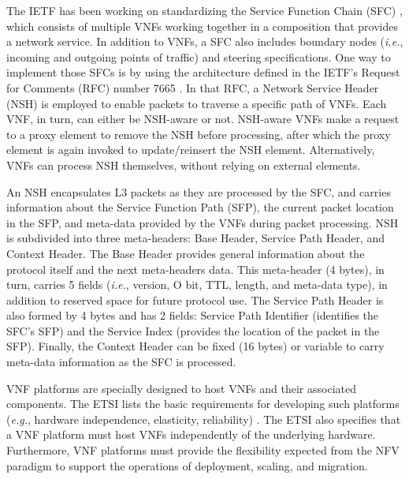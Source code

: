 The IETF has been working on standardizing the Service Function Chain (SFC) \cite{Joel-2015}, which consists of multiple VNFs working together in a composition that provides a network service. In addition to VNFs, a SFC also includes boundary nodes (\textit{i.e.},  incoming and outgoing points of traffic) and steering specifications. One way to implement those SFCs is by using the architecture defined in the IETF's Request for Comments (RFC) number 7665 \cite{Joel-2015}. In that RFC, a Network Service Header (NSH) \cite{Quinn-2018} is employed to enable packets to traverse a specific path of VNFs. Each VNF, in turn, can either be NSH-aware or not. NSH-aware VNFs make a request to a proxy element to remove the NSH before processing, after which the proxy element is again invoked to update/reinsert the NSH element. Alternatively, VNFs can process NSH themselves, without relying on external elements.

An NSH encapsulates L3 packets as they are processed by the SFC, and carries information about the Service Function Path (SFP), the current packet location in the SFP, and meta-data provided by the VNFs during packet processing.  NSH is subdivided into three meta-headers: Base Header, Service Path Header, and Context Header. The Base Header provides general information about the protocol itself and the next meta-headers data. This meta-header (4 bytes), in turn, carries 5 fields (\textit{i.e.}, version, O bit, TTL, length, and meta-data type), in addition to reserved space for future protocol use. The Service Path Header is also formed by 4 bytes and has 2 fields: Service Path Identifier (identifies the SFC's SFP) and the Service Index (provides the location of the packet in the SFP). Finally, the Context Header can be fixed (16 bytes) or variable to carry meta-data information as the SFC is processed.


VNF platforms are specially designed to host VNFs and their associated components. The ETSI lists the basic requirements for developing such platforms (\textit{e.g.}, hardware independence, elasticity, reliability) \cite{SWA-2014}. The ETSI also specifies that a VNF platform must host VNFs independently of the underlying hardware. Furthermore, VNF platforms must provide the flexibility expected from the NFV paradigm to support the operations of deployment, scaling, and migration.


